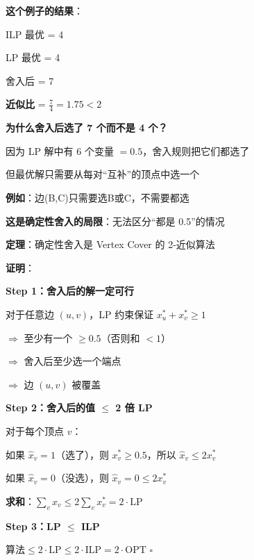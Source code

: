 \documentclass[12pt, a4paper]{ctexart}
\begin{document}
\begin{blackboard}[分析近似比]

\textbf{这个例子的结果}：

ILP 最优 = 4

LP 最优 = 4

舍入后 = 7

\textbf{近似比} = $\frac{7}{4} = 1.75 < 2$ \checkmark

\textbf{为什么舍入后选了 7 个而不是 4 个？}

因为 LP 解中有 6 个变量 $= 0.5$，舍入规则把它们都选了

但最优解只需要从每对``互补''的顶点中选一个

\textbf{例如}：边(B,C)只需要选B或C，不需要都选

\textbf{这是确定性舍入的局限}：无法区分``都是 0.5''的情况

\end{blackboard}

\begin{blackboard}[2-近似的证明]

\textbf{定理}：确定性舍入是 Vertex Cover 的 2-近似算法

\textbf{证明}：

\textbf{Step 1：舍入后的解一定可行}

对于任意边 $(u, v)$，LP 约束保证 $x_u^* + x_v^* \geq 1$

$\Rightarrow$ 至少有一个 $\geq 0.5$（否则和 $< 1$）

$\Rightarrow$ 舍入后至少选一个端点

$\Rightarrow$ 边 $(u, v)$ 被覆盖 \checkmark

\textbf{Step 2：舍入后的值 $\leq$ 2 倍 LP}

对于每个顶点 $v$：

如果 $\hat{x}_v = 1$（选了），则 $x_v^* \geq 0.5$，所以 $\hat{x}_v \leq 2 x_v^*$

如果 $\hat{x}_v = 0$（没选），则 $\hat{x}_v = 0 \leq 2 x_v^*$

\textbf{求和}：$\sum_v \hat{x}_v \leq 2 \sum_v x_v^* = 2 \cdot \text{LP}$

\textbf{Step 3：LP $\leq$ ILP}

$\text{算法} \leq 2 \cdot \text{LP} \leq 2 \cdot \text{ILP} = 2 \cdot \text{OPT}$ \quad $\square$

\end{blackboard}
\end{document}

